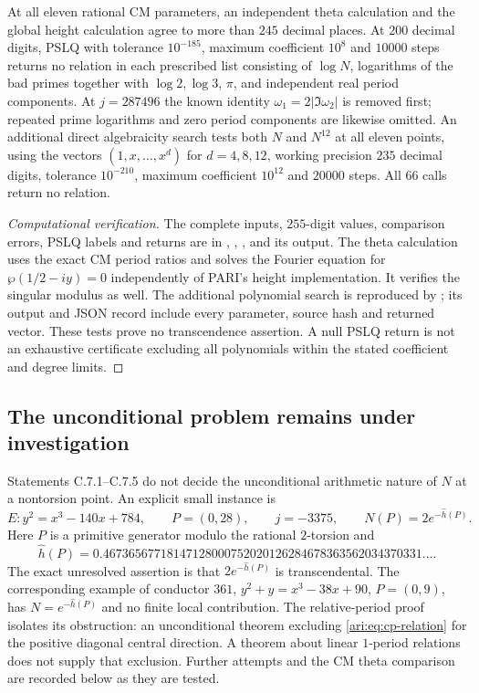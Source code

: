 \begin{proposition}\label{ari:C.7.5}
At all eleven rational CM parameters, an independent theta
calculation and the global height calculation agree to more
than $245$ decimal places. At $200$ decimal digits, PSLQ
with tolerance $10^{-185}$, maximum coefficient $10^8$ and
$10000$ steps returns no relation in each prescribed list
consisting of $\log N$, logarithms of the bad primes together
with $\log2,\log3$, $\pi$, and independent real period
components. At $j=287496$ the known identity
$\omega_1=2|\Im\omega_2|$ is removed first; repeated prime
logarithms and zero period components are likewise omitted.
An additional direct algebraicity search tests both $N$ and $N^{12}$
at all eleven points, using the vectors $(1,x,\ldots,x^d)$ for
$d=4,8,12$, working precision $235$ decimal digits, tolerance
$10^{-210}$, maximum coefficient $10^{12}$ and $20000$ steps.
All $66$ calls return no relation.
\end{proposition}
\begin{proof}[Computational verification]
The complete inputs, $255$-digit values, comparison errors,
PSLQ labels and returns are in
, ,
, and its output. The theta
calculation uses the exact CM period ratios and solves the
Fourier equation for $\wp(1/2-iy)=0$ independently of PARI's
height implementation. It verifies the singular modulus
as well. The additional polynomial search is reproduced by
; its output and JSON
record include every parameter, source hash and returned vector.
These tests prove no transcendence assertion. A null PSLQ return
is not an exhaustive certificate excluding all polynomials within
the stated coefficient and degree limits.
\end{proof}

\subsection{The unconditional problem remains under investigation}

Statements C.7.1--C.7.5 do not decide the unconditional
arithmetic nature of $N$ at a nontorsion point. An explicit
small instance is
\[
 E:y^2=x^3-140x+784,\qquad P=(0,28),\qquad j=-3375,
 \qquad N(P)=2e^{-\widehat h(P)}.
\]
Here $P$ is a primitive generator modulo the rational
$2$-torsion and
\[
 \widehat h(P)=
 0.46736567718147128000752020126284678363562034370331\ldots.
\]
The exact unresolved assertion is that $2e^{-\widehat h(P)}$
is transcendental. The corresponding example of conductor
$361$, $y^2+y=x^3-38x+90$, $P=(0,9)$, has
$N=e^{-\widehat h(P)}$ and no finite local contribution.
The relative-period proof isolates its obstruction: an
unconditional theorem excluding
\eqref{ari:eq:cp-relation} for the positive diagonal central
direction. A theorem about linear $1$-period relations
does not supply that exclusion. Further attempts and the
CM theta comparison are recorded below as they are tested.
